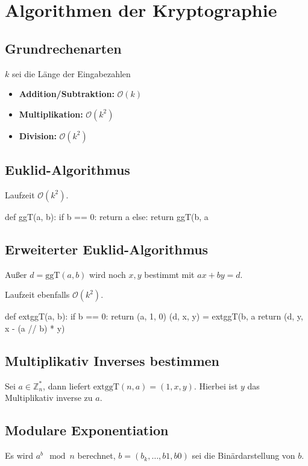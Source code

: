 \chapter{Algorithmen der Kryptographie}
\section{Grundrechenarten}
$k$ sei die Länge der Eingabezahlen
\begin{itemize}
    \item \textbf{Addition/Subtraktion:} $\mathcal{O}(k)$
    \item \textbf{Multiplikation:} $\mathcal{O}(k^2)$
    \item \textbf{Division:} $\mathcal{O}(k^2)$
\end{itemize}

\section{Euklid-Algorithmus}
Laufzeit $\mathcal{O}(k^2)$.
\begin{python}
def ggT(a, b):
    if b == 0:
        return a
    else:
        return ggT(b, a %
\end{python}

\section{Erweiterter Euklid-Algorithmus}
Außer $d = \text{ggT}(a, b)$ wird noch $x, y$ bestimmt mit $ax + by = d$.

Laufzeit ebenfalls $\mathcal{O}(k^2)$.

\begin{python}
def extggT(a, b):
    if b == 0:
        return (a, 1, 0)
    (d, x, y) = extggT(b, a %
    return (d, y, x - (a // b) * y)
\end{python}

\section{Multiplikativ Inverses bestimmen}
Sei $a \in \mathbb{Z}_n^*$, dann liefert $\text{extggT}(n, a) = (1, x, y)$. Hierbei
ist $y$ das Multiplikativ inverse zu $a$.

\section{Modulare Exponentiation}
Es wird $a^b \mod n$ berechnet, $b = (b_k, \ldots, b1, b0)$ sei die Binärdarstellung von
$b$.

